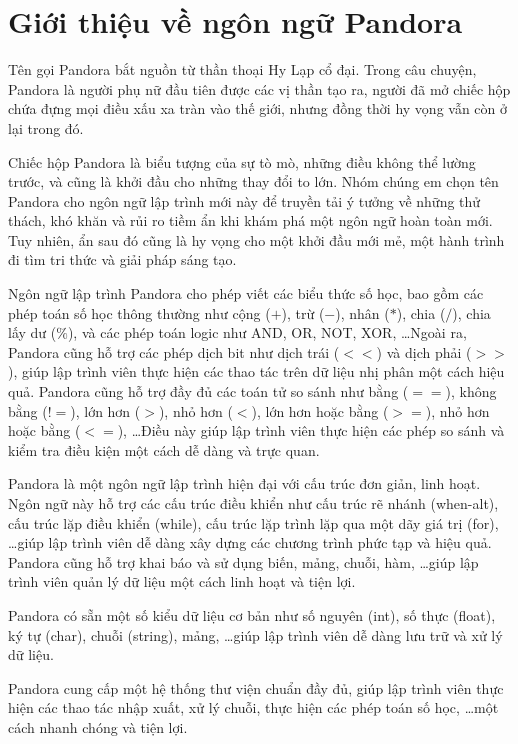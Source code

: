 \section{Giới thiệu về ngôn ngữ Pandora}
    Tên gọi Pandora bắt nguồn từ thần thoại Hy Lạp cổ đại. Trong câu chuyện, Pandora là người phụ nữ đầu tiên được các vị thần tạo ra, người đã mở chiếc hộp chứa đựng mọi điều xấu xa tràn vào thế giới, nhưng đồng thời hy vọng vẫn còn ở lại trong đó.

    Chiếc hộp Pandora là biểu tượng của sự tò mò, những điều không thể lường trước, và cũng là khởi đầu cho những thay đổi to lớn. Nhóm chúng em chọn tên Pandora cho ngôn ngữ lập trình mới này để truyền tải ý tưởng về những thử thách, khó khăn và rủi ro tiềm ẩn khi khám phá một ngôn ngữ hoàn toàn mới. Tuy nhiên, ẩn sau đó cũng là hy vọng cho một khởi đầu mới mẻ, một hành trình đi tìm tri thức và giải pháp sáng tạo.

    Ngôn ngữ lập trình Pandora cho phép viết các biểu thức số học, bao gồm các phép toán số học thông thường như cộng ($+$), trừ ($-$), nhân ($*$), chia ($/$), chia lấy dư ($\%$), và các phép toán logic như AND, OR, NOT, XOR, \dots Ngoài ra, Pandora cũng hỗ trợ các phép dịch bit như dịch trái ($<<$) và dịch phải ($>>$), giúp lập trình viên thực hiện các thao tác trên dữ liệu nhị phân một cách hiệu quả. Pandora cũng hỗ trợ đầy đủ các toán tử so sánh như bằng ($==$), không bằng ($!=$), lớn hơn ($>$), nhỏ hơn ($<$), lớn hơn hoặc bằng ($>=$), nhỏ hơn hoặc bằng ($<=$), \dots Điều này giúp lập trình viên thực hiện các phép so sánh và kiểm tra điều kiện một cách dễ dàng và trực quan.

    Pandora là một ngôn ngữ lập trình hiện đại với cấu trúc đơn giản, linh hoạt. Ngôn ngữ này hỗ trợ các cấu trúc điều khiển như cấu trúc rẽ nhánh (when-alt), cấu trúc lặp điều khiển (while), cấu trúc lặp trình lặp qua một dãy giá trị (for), \dots giúp lập trình viên dễ dàng xây dựng các chương trình phức tạp và hiệu quả. Pandora cũng hỗ trợ khai báo và sử dụng biến, mảng, chuỗi, hàm, \dots giúp lập trình viên quản lý dữ liệu một cách linh hoạt và tiện lợi.

    Pandora có sẵn một số kiểu dữ liệu cơ bản như số nguyên (int), số thực (float), ký tự (char), chuỗi (string), mảng, \dots giúp lập trình viên dễ dàng lưu trữ và xử lý dữ liệu.

    Pandora cung cấp một hệ thống thư viện chuẩn đầy đủ, giúp lập trình viên thực hiện các thao tác nhập xuất, xử lý chuỗi, thực hiện các phép toán số học, \dots một cách nhanh chóng và tiện lợi.

